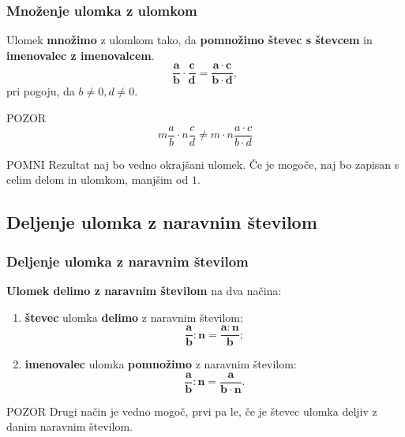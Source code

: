         \begin{frame}[t]
            \frametitle{Množenje ulomka z ulomkom}

            \begin{alertblock}{}
                Ulomek \textbf{množimo} z ulomkom tako, da \textbf{pomnožimo števec s števcem} in \textbf{imenovalec z imenovalcem}.
                $$ \mathbf{\frac{a}{b}\cdot\frac{c}{d}=\frac{a\cdot c}{b\cdot d}}, $$ pri pogoju, da $b\neq 0, d\neq 0$.
            \end{alertblock}

            \begin{exampleblock}{POZOR}
                $$ m\frac{a}{b}\cdot n\frac{c}{d}\neq m\cdot n\frac{a\cdot c}{b\cdot d} $$
            \end{exampleblock}

            \begin{block}{POMNI}
                Rezultat naj bo vedno okrajšani ulomek. Če je mogoče, naj bo zapisan s celim delom  in ulomkom, manjšim od $1$.
            \end{block}

        \end{frame}

    \subsection{Deljenje ulomka z naravnim številom}

        \begin{frame}[t]
            \frametitle{Deljenje ulomka z naravnim številom}

            \begin{alertblock}{}
                \textbf{Ulomek delimo z naravnim številom} na dva načina:
                \begin{enumerate}
                    \item \textbf{števec} ulomka \textbf{delimo} z naravnim številom: $$\mathbf{\frac{a}{b}:n=\frac{a:n}{b}};$$
                    \item \textbf{imenovalec} ulomka \textbf{pomnožimo} z naravnim številom: $$\mathbf{\frac{a}{b}:n=\frac{a}{b\cdot n}}.$$
                \end{enumerate}
            \end{alertblock}                
            
            \begin{exampleblock}{POZOR}
                Drugi način je vedno mogoč, prvi pa le, če je števec ulomka deljiv z danim naravnim številom.
            \end{exampleblock}
        \end{frame}

